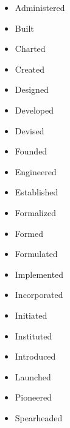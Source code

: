 \documentclass{article}
\begin{document}
\begin{longtable}
\begin{minipage}[t]{0.47\columnwidth}
\begin{itemize}
\item
  Administered
\item
  Built
\item
  Charted
\item
  Created
\item
  Designed
\item
  Developed
\item
  Devised
\item
  Founded
\item
  Engineered
\item
  Established
\item
  Formalized
\item
  Formed
\item
  Formulated
\item
  Implemented
\item
  Incorporated
\item
  Initiated
\item
  Instituted
\item
  Introduced
\item
  Launched
\item
  Pioneered
\item
  Spearheaded
\end{itemize}\strut
\end{minipage}\tabularnewline
\bottomrule
\end{longtable}
\end{document}
